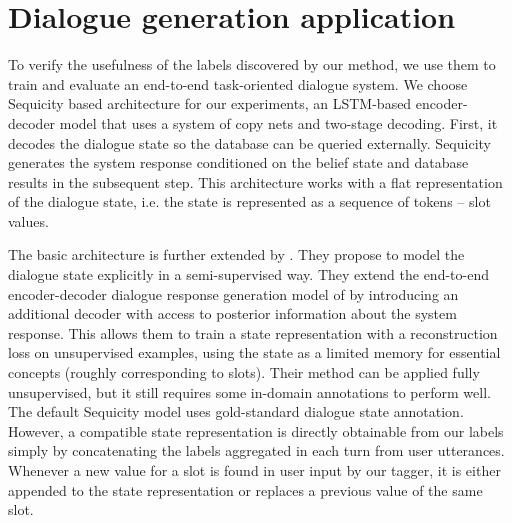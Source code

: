 \section{Dialogue generation application}
To verify the usefulness of the labels discovered by our method, we use them to train and evaluate an end-to-end task-oriented dialogue system.
We choose Sequicity \cite{lei2018sequicity} based architecture for our experiments, an LSTM-based encoder-decoder model that uses a system of copy nets and two-stage decoding.
First, it decodes the dialogue state so the database can be queried externally.
Sequicity generates the system response conditioned on the belief state and database results in the subsequent step.
This architecture works with a flat representation of the dialogue state, i.e. the state is represented as a sequence of tokens -- slot values.

The basic architecture is further extended by \citet{jin2018explicit}.
They propose to model the dialogue state explicitly in a semi-supervised way.
They extend the end-to-end encoder-decoder dialogue response generation model of \citet{lei2018sequicity} by introducing an additional decoder with access to posterior information about the system response.
This allows them to train a state representation with a reconstruction loss on unsupervised examples, using the state as a limited memory for essential concepts (roughly corresponding to slots).
Their method can be applied fully unsupervised, but it still requires some in-domain annotations to perform well.
The default Sequicity model uses gold-standard dialogue state annotation. However, a compatible state representation is directly obtainable from our labels simply by concatenating the labels aggregated in each turn from user utterances. Whenever a new value for a slot is found in user input by our tagger, it is either appended to the state representation or replaces a previous value of the same slot.

